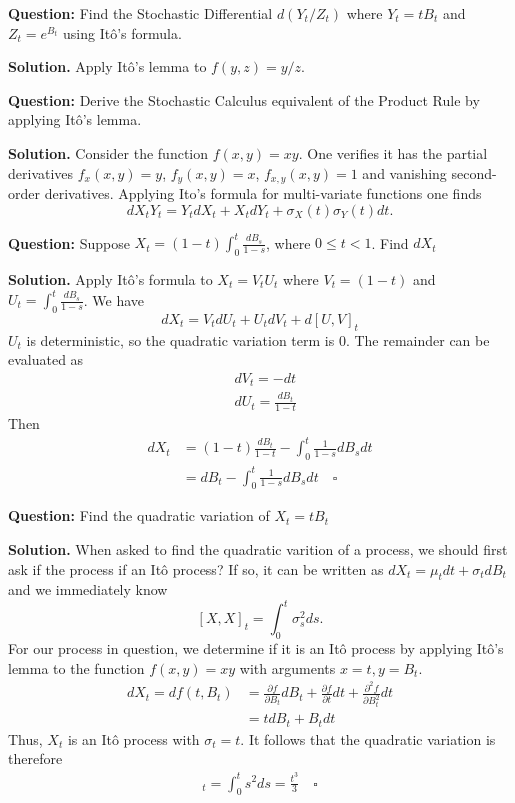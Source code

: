 \documentclass{article}
\begin{document}
\begin{tcolorbox}[colframe=black,colback=gray!5,boxrule=0.5pt]
\textbf{Question:} Find the Stochastic Differential $d(Y_t / Z_t)$ where $Y_t = tB_t$ and $Z_t=e^{B_t}$ using Itô's formula. \cite{Fima}
\end{tcolorbox}
\textbf{Solution.} Apply Itô's lemma to $f(y,z) = y/z$. 


\begin{tcolorbox}[colframe=black,colback=gray!5,boxrule=0.5pt]
\textbf{Question:} Derive the Stochastic Calculus equivalent of the Product Rule by applying Itô's lemma. 
\end{tcolorbox}
\textbf{Solution.} Consider the function $f(x,y) = xy$. One verifies it has the partial derivatives $f_x(x,y)=y$, $f_y(x,y)=x$, $f_{x,y}(x,y)=1$ and vanishing second-order derivatives. Applying Ito's formula for multi-variate functions one finds
$$dX_tY_t = Y_tdX_t + X_tdY_t + \sigma_X(t)\sigma_Y(t)dt.$$

\begin{tcolorbox}[colframe=black,colback=gray!5,boxrule=0.5pt]
\textbf{Question:} Suppose $X_t = (1-t)\int_0^t\frac{dB_s}{1-s}$, where $0\leq t<1$. Find $dX_t$
\end{tcolorbox}
\textbf{Solution.} Apply Itô's formula to $X_t = V_tU_t$ where $V_t = (1-t)$ and $U_t= \int_0^t\frac{dB_s}{1-s}$. We have 
$$dX_t = V_tdU_t + U_tdV_t+ d[U, V]_t$$
$U_t$ is deterministic, so the quadratic variation term is 0. The remainder can be evaluated as 
\begin{align*}
    & dV_t = -dt \\
    & dU_t = \frac{dB_t}{1-t}
\end{align*}
Then 
\begin{align*}
    dX_t &= (1-t)\frac{dB_t}{1-t} -\int_0^t\frac{1}{1-s}dB_sdt \\
    &= dB_t-\int_0^t\frac{1}{1-s}dB_sdt \quad \square
\end{align*}

\begin{tcolorbox}[colframe=black,colback=gray!5,boxrule=0.5pt]
\textbf{Question:} Find the quadratic variation of $X_t = tB_t$
\end{tcolorbox}
\textbf{Solution.} When asked to find the quadratic varition of a process, we should first ask if the process if an Itô process? If so, it can be written as $dX_t = \mu_t dt + \sigma_t dB_t$ and we immediately know 
$$[X, X]_t = \int_0^t\sigma_s^2ds.$$
For our process in question, we determine if it is an Itô process by applying Itô's lemma to the function $f(x,y) = xy$ with arguments $x=t, y=B_t$. 
\begin{align*}
    dX_t = df(t,B_t) &= \frac{\partial f}{\partial B_t}dB_t + \frac{\partial f}{\partial t}dt + \frac{\partial^2 f}{\partial B_t^2}dt \\
    &=tdB_t + B_tdt
\end{align*}
Thus, $X_t$ is an Itô process with $\sigma_t = t$. It follows that the quadratic variation is therefore
\begin{align*}
    [X,X]_t = \int_0^t s^2ds = \frac{t^3}{3} \quad \square
\end{align*}
\end{document}

